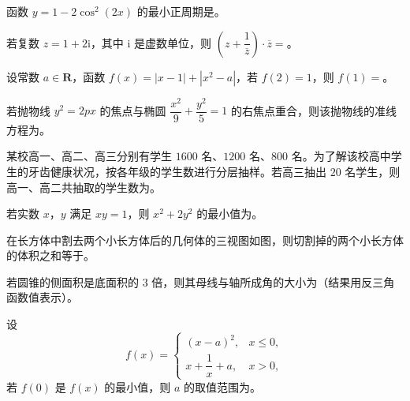 \begin{question}
函数 $y=1-2\cos^2(2x)$ 的最小正周期是\gkblank{}。

\end{question}
\begin{question}
若复数 $z=1+2\mathrm i$，其中 $\mathrm i$ 是虚数单位，则 $\left(z+\dfrac1{\overline z}\right)\cdot\overline z=$\gkblank{}。

\end{question}
\begin{question}
设常数 $a\in\mathbf R$，函数 $f(x)=|x-1|+|x^2-a|$，若 $f(2)=1$，则 $f(1)=$\gkblank{}。

\end{question}
\begin{question}
若抛物线 $y^2=2px$ 的焦点与椭圆 $\dfrac{x^2}{9}+\dfrac{y^2}{5}=1$ 的右焦点重合，则该抛物线的准线方程为\gkblank{}。

\end{question}
\begin{question}
某校高一、高二、高三分别有学生 $1600$ 名、$1200$ 名、$800$ 名。为了解该校高中学生的牙齿健康状况，按各年级的学生数进行分层抽样。若高三抽出 $20$ 名学生，则高一、高二共抽取的学生数为\gkblank{}。

\end{question}
\begin{question}
若实数 $x$，$y$ 满足 $xy=1$，则 $x^2+2y^2$ 的最小值为\gkblank{}。

\Needspace{0.4\textheight}
\end{question}
\begin{question}
在长方体中割去两个小长方体后的几何体的三视图如图，则切割掉的两个小长方体的体积之和等于\gkblank{}。
\nopagebreak[4]
\begin{center}\end{center}
\nopagebreak[4]
\end{question}
\begin{question}
若圆锥的侧面积是底面积的 $3$ 倍，则其母线与轴所成角的大小为\gkblank{}（结果用反三角函数值表示）。

\end{question}
\begin{question}
设
\nopagebreak[4]
\[f(x)=\begin{cases}
(x-a)^2, & x\leqslant0,\\
x+\dfrac1x+a, & x>0,
\end{cases}\]
若 $f(0)$ 是 $f(x)$ 的最小值，则 $a$ 的取值范围为\gkblank{}。

\end{question}
